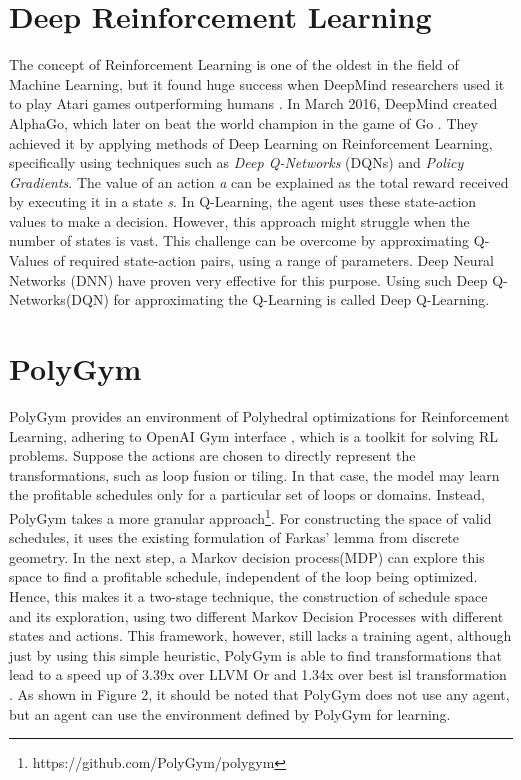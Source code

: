 \documentclass[logo,msc]{infthesis}           %
\begin{document}
\section{Deep Reinforcement Learning}

The concept of Reinforcement Learning is one of the oldest in the field of Machine Learning, but it found huge success when DeepMind researchers used it to play Atari games outperforming humans \cite{DeepMind}. In March 2016, DeepMind created AlphaGo, which later on beat the world champion in the game of Go \cite{AlphaGo}. They achieved it by applying methods of Deep Learning on Reinforcement Learning, specifically using techniques such as \textit{Deep Q-Networks} (DQNs) and \textit{Policy Gradients}. The value of an action \textit{a} can be explained as the total reward received by executing it in a state \textit{s}. In Q-Learning, the agent uses these state-action values to make a decision. However, this approach might struggle when the number of states is vast. This challenge can be overcome by approximating Q-Values of required state-action pairs, using a range of parameters. Deep Neural Networks (DNN) have proven very effective for this purpose. Using such Deep Q-Networks(DQN) for approximating the Q-Learning is called Deep Q-Learning.

\section{PolyGym}

PolyGym provides an environment of Polyhedral optimizations for Reinforcement Learning, adhering to OpenAI Gym interface \cite{Gym}, which is a toolkit for solving RL problems. Suppose the actions are chosen to directly represent the transformations, such as loop fusion or tiling. In that case, the model may learn the profitable schedules only for a particular set of loops or domains. Instead, PolyGym takes a more granular approach\footnote{https://github.com/PolyGym/polygym}. For constructing the space of valid schedules, it uses the existing formulation of Farkas' lemma from discrete geometry. In the next step, a Markov decision process(MDP) can explore this space to find a profitable schedule, independent of the loop being optimized. Hence, this makes it a two-stage technique, the construction of schedule space and its exploration, using two different Markov Decision Processes with different states and actions. This framework, however, still lacks a training agent, although just by using this simple heuristic, PolyGym is able to find transformations that lead to a speed up of 3.39x over LLVM Or and 1.34x over best isl transformation \cite{9563041}. As shown in Figure 2, it should be noted that PolyGym does not use any agent, but an agent can use the environment defined by PolyGym for learning.
\end{document}
